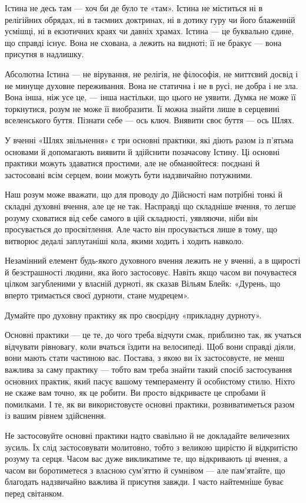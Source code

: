 Істина не десь там — хоч би де було те «там». Істина не міститься ні в релігійних обрядах, ні в таємних доктринах, ні в дотику гуру чи його блаженній усмішці, ні в екзотичних краях чи давніх храмах. Істина — це буквально єдине, що справді існує. Вона не схована, а лежить на видноті; її не бракує — вона присутня в надлишку.

Абсолютна Істина — не вірування, не релігія, не філософія, не миттєвий досвід і не минуще духовне переживання. Вона не статична і не в русі, не добра і не зла. Вона інша, ніж усе це, — інша настільки, що цього не уявити. Думка не може її торкнутися, розум не може її виобразити. Її можна знайти лише в серцевині вселенського буття. Пізнати себе — ось ключ. Виявити своє буття — ось Шлях.

У вченні «Шлях звільнення» є три основні практики, які діють разом із п'ятьма основами й допомагають виявити й здійснити позачасову Істину. Ці основні практики можуть здаватися простими, але не обманюйтеся: поєднані й застосовані всім серцем, вони можуть бути надзвичайно потужними.

Наш розум може вважати, що для проводу до Дійсності нам потрібні тонкі й складні духовні вчення, але це не так. Насправді що складніше вчення, то легше розуму сховатися від себе самого в цій складності, уявляючи, ніби він просувається до просвітлення. Але часто він просувається лише в тому, що витворює дедалі заплутаніші кола, якими ходить і ходить навколо.

Незамінний елемент будь-якого духовного вчення лежить не у вченні, а в щирості й безстрашності людини, яка його застосовує. Навіть якщо часом ви почуваєтеся цілком загубленими у власній дурноті, як сказав Вільям Блейк: «Дурень, що вперто тримається своєї дурноти, стане мудрецем».

Думайте про духовну практику як про своєрідну «прикладну дурноту».

Основні практики — це те, до чого треба відчути смак, приблизно так, як учаться відчувати рівновагу, коли вчаться їздити на велосипеді. Щоб вони справді діяли, вони мають стати частиною вас. Постава, з якою ви їх застосовуєте, не менш важлива за саму практику — тобто вам треба знайти такий спосіб застосування основних практик, який пасує вашому темпераменту й особистому стилю. Ніхто не скаже вам точно, як це робити. Ви просто відкриваєте це спробами й помилками. І те, як ви використовуєте основні практики, розвиватиметься разом із вашим рівнем здійснення.

Не застосовуйте основні практики надто свавільно й не докладайте величезних зусиль. Їх слід застосовувати молитовно, тобто з великою щирістю й відкритістю розуму та серця. Часом вас дуже викликатиме те, що відкривають ці вчення, а часом ви боротиметеся з власною сум'яттю й сумнівом — але пам'ятайте, що благодать надзвичайно важлива й присутня завжди. І часто найтемніше буває перед світанком.

